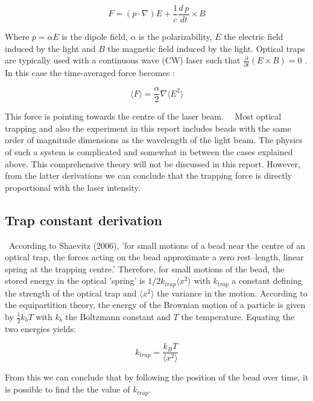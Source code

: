 \begin{equation}
	F  =  (p \cdot \nabla)E + \frac{1}{c} \frac{d \: p}{dt} \times B
\end{equation}

Where $ p = \alpha E $ is the dipole field, $\alpha $ is the polarizability, $E$ the electric field induced by the light and $B$ the magnetic field induced by the light. Optical traps are typically used with a continuous wave (CW) laser such that $ \frac{\partial}{\partial t}(E \times B) = 0 $ . In this case the time-averaged force becomes \cite{shaevitz}:

\begin{equation}
	\big \langle F \big \rangle  = \frac{ \alpha }{2} \nabla \big \langle E^2 \big \rangle
\end{equation}

This force is pointing towards the centre of the laser beam. \
\
Most optical trapping and also the experiment in this report includes beads with the same order of magnitude dimensions as the wavelength of the light beam. The physics of such a system is complicated and somewhat in between the cases explained above. This comprehensive theory will not be discussed in this report. However, from the latter derivations we can conclude that the trapping force is directly proportional with the laser intensity. \

\subsection{Trap constant derivation}
\label{trap_constant}
\
According to Shaevitz (2006), 'for small motions of a bead near the centre of an optical trap, the forces acting on the bead approximate a zero rest–length, linear spring at the trapping centre.' Therefore, for small motions of the bead, the stored energy in the optical 'spring' is $1/2 k_{trap} \langle x^2 \rangle $ with $k_{trap}$ a constant defining the strength of the optical trap and $ \langle x^2 \rangle $ the variance in the motion. According to the equipartition theory, the energy of the Brownian motion of a particle is given by $\frac{1}{2} k_b T $ with $ k_b $ the Boltzmann constant and $T$ the temperature.\cite{shaevitz} Equating the two energies yields:

\begin{equation}
	\label{eq_k_trap}
	k_{trap} = \frac{k_B T}{ \langle x^2 \rangle}
\end{equation}

From this we can conclude that by following the position of the bead over time, it is possible to find the the value of $k_{trap}$. \

